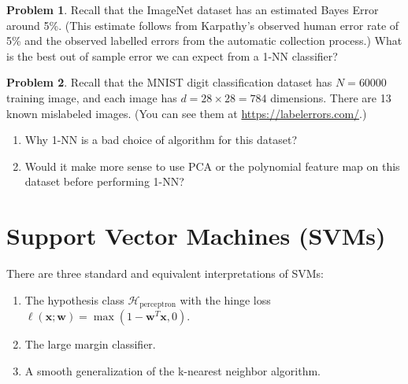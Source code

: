 \documentclass[10pt]{exam}
\theoremstyle{definition}
\newtheorem{problem}{Problem}
\newtheorem{note}{Note}
\newcommand{\trans}[1]{{#1}^{T}}
\newcommand{\loss}{\ell}
\newcommand{\w}{\mathbf w}
\newcommand{\x}{\mathbf x}
\newcommand{\HH}[1]{\mathcal H_{\text{#1}}}
\begin{document}
\newpage
\begin{problem}
    Recall that the ImageNet dataset has an estimated Bayes Error around 5\%.
    (This estimate follows from Karpathy's observed human error rate of 5\% and the observed labelled errors from the automatic collection process.)
    What is the best out of sample error we can expect from a 1-NN classifier?
\end{problem}

\vspace{3in}
\begin{problem}
    Recall that the MNIST digit classification dataset has $N=60000$ training image, and each image has $d=28\times28=784$ dimensions.
    There are 13 known mislabeled images.
    (You can see them at \url{https://labelerrors.com/}.)
    \begin{enumerate}
        \item Why 1-NN is a bad choice of algorithm for this dataset?
        \vspace{2in}
        \item Would it make more sense to use PCA or the polynomial feature map on this dataset before performing 1-NN?
    \end{enumerate}
\end{problem}

%

\newpage
\section*{Support Vector Machines (SVMs)}

There are three standard and equivalent interpretations of SVMs:
\begin{enumerate}
\item The hypothesis class $\HH{perceptron}$ with the hinge loss $\loss(\x;\w) = \max(1-\trans\w\x, 0)$.
\item The large margin classifier.
\item A smooth generalization of the k-nearest neighbor algorithm.
\end{enumerate}
\end{document}
